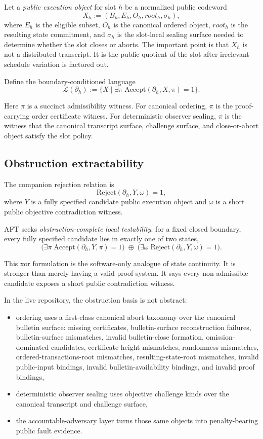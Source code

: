 \documentclass[11pt]{article}
\newcommand{\AFT}{\textsc{AFT}}
\newcommand{\term}[1]{\textit{#1}}
\newcommand{\suchthat}{\;|\;}
\begin{document}
Let a \term{public execution object} for slot \(h\) be a normalized public
codeword
\[
X_h := (B_h, E_h, O_h, root_h, \sigma_h),
\]
where \(E_h\) is the eligible subset, \(O_h\) is the canonical ordered object,
\(root_h\) is the resulting state commitment, and \(\sigma_h\) is the
slot-local sealing surface needed to determine whether the slot closes or
aborts. The important point is that \(X_h\) is not a distributed transcript.
It is the public quotient of the slot after irrelevant schedule variation is
factored out.

Define the boundary-conditioned language
\[
\mathcal{L}(\partial_h) := \{X \suchthat \exists \pi \; \mathrm{Accept}(\partial_h, X, \pi)=1 \}.
\]

Here \(\pi\) is a succinct admissibility witness. For canonical ordering,
\(\pi\) is the proof-carrying order certificate witness. For deterministic
observer sealing, \(\pi\) is the witness that the canonical transcript surface,
challenge surface, and close-or-abort object satisfy the slot policy.

\subsection{Obstruction extractability}

The companion rejection relation is
\[
\mathrm{Reject}(\partial_h, Y, \omega)=1,
\]
where \(Y\) is a fully specified candidate public execution object and
\(\omega\) is a short public objective contradiction witness.

\AFT{} seeks \term{obstruction-complete local testability}: for a fixed closed
boundary, every fully specified candidate lies in exactly one of two states,
\[
\Big(\exists \pi \; \mathrm{Accept}(\partial_h, Y, \pi)=1\Big)
\;\oplus\;
\Big(\exists \omega \; \mathrm{Reject}(\partial_h, Y, \omega)=1\Big).
\]

This xor formulation is the software-only analogue of state continuity. It is
stronger than merely having a valid proof system. It says every non-admissible
candidate exposes a short public contradiction witness.

In the live repository, the obstruction basis is not abstract:

\begin{itemize}[leftmargin=1.5em]
\item ordering uses a first-class canonical abort taxonomy over the canonical
bulletin surface: missing certificates, bulletin-surface reconstruction
failures, bulletin-surface mismatches, invalid bulletin-close formation,
omission-dominated candidates, certificate-height mismatches, randomness
mismatches, ordered-transactions-root mismatches, resulting-state-root
mismatches, invalid public-input bindings, invalid bulletin-availability
bindings, and invalid proof bindings,
\item deterministic observer sealing uses objective challenge kinds over the
canonical transcript and challenge surface,
\item the accountable-adversary layer turns those same objects into
penalty-bearing public fault evidence.
\end{itemize}
\end{document}
